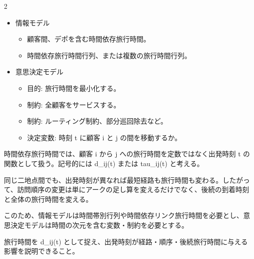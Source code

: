 \clearpage



\vspace{1.5mm}

\begin{multicols}{2}

\footnotesize

\raggedcolumns


\begin{itemize}
\item 情報モデル
\begin{itemize}
\item 顧客間、デポを含む時間依存旅行時間。
\item 時間依存旅行時間行列、または複数の旅行時間行列。
\end{itemize}
\item 意思決定モデル
\begin{itemize}
\item 目的: 旅行時間を最小化する。
\item 制約: 全顧客をサービスする。
\item 制約: ルーティング制約、部分巡回除去など。
\item 決定変数: 時刻 t に顧客 i と j の間を移動するか。
\end{itemize}
\end{itemize}

時間依存旅行時間では、顧客 i から j への旅行時間を定数ではなく出発時刻 t の関数として扱う。記号的には d\_ij(t) または tau\_ij(t) と考える。\par

同じ二地点間でも、出発時刻が異なれば最短経路も旅行時間も変わる。したがって、訪問順序の変更は単にアークの足し算を変えるだけでなく、後続の到着時刻と全体の旅行時間を変える。\par

このため、情報モデルは時間帯別行列や時間依存リンク旅行時間を必要とし、意思決定モデルは時間の次元を含む変数・制約を必要とする。\par

旅行時間を d\_ij(t) として捉え、出発時刻が経路・順序・後続旅行時間に与える影響を説明できること。\par


\end{multicols}
